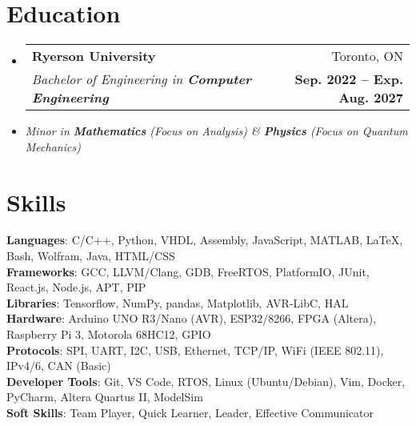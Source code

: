 \documentclass[letterpaper,11pt]{article}
\makeatletter
\newcommand{\resumeItem}[1]{
  \item\small{
    {#1 \vspace{-2pt}}
  }
}
\newcommand{\resumeSubheading}[4]{
  \vspace{-2pt}\item
    \begin{tabular*}{0.97\textwidth}[t]{l@{\extracolsep{\fill}}r}
      \textbf{#1} & #2 \\
      \textit{\small#3} & {\small#4} \\ %
    \end{tabular*}\vspace{-7pt}
}
\newcommand{\resumeSubHeadingListStart}{\begin{itemize}[leftmargin=0.15in, label={}]}
\newcommand{\resumeSubHeadingListEnd}{\end{itemize}}
\makeatother
\begin{document}
\section{Education}
  \resumeSubHeadingListStart
    \resumeSubheading
      {Ryerson University}{Toronto, ON}
      {Bachelor of Engineering in \textbf{Computer Engineering}}{\textbf{Sep. 2022 -- Exp. Aug. 2027}}
      \resumeItem{\textit{Minor in \textbf{Mathematics} (Focus on Analysis) \& \textbf{Physics} (Focus on Quantum Mechanics)}}
  \resumeSubHeadingListEnd

\section{Skills}
 \begin{itemize}[leftmargin=0.15in, label={}]
    \small{\item{
     \textbf{Languages}{: C/C++, Python, VHDL, Assembly, JavaScript, MATLAB, LaTeX, Bash, Wolfram, Java, HTML/CSS} \\
     \textbf{Frameworks}{: GCC, LLVM/Clang, GDB, FreeRTOS, PlatformIO, JUnit, React.js, Node.js, APT, PIP} \\
     \textbf{Libraries}{: Tensorflow, NumPy, pandas, Matplotlib, AVR-LibC, HAL} \\
     \textbf{Hardware}{: Arduino UNO R3/Nano (AVR), ESP32/8266, FPGA (Altera), Raspberry Pi 3, Motorola 68HC12, GPIO} \\
     \textbf{Protocols}{: SPI, UART, I2C, USB, Ethernet, TCP/IP, WiFi (IEEE 802.11), IPv4/6, CAN (Basic)} \\
     \textbf{Developer Tools}{: Git, VS Code, RTOS, Linux (Ubuntu/Debian), Vim, Docker, PyCharm, Altera Quartus II, ModelSim} \\
     \textbf{Soft Skills}{: Team Player, Quick Learner, Leader, Effective Communicator} \\
    }}
 \end{itemize}
\end{document}
